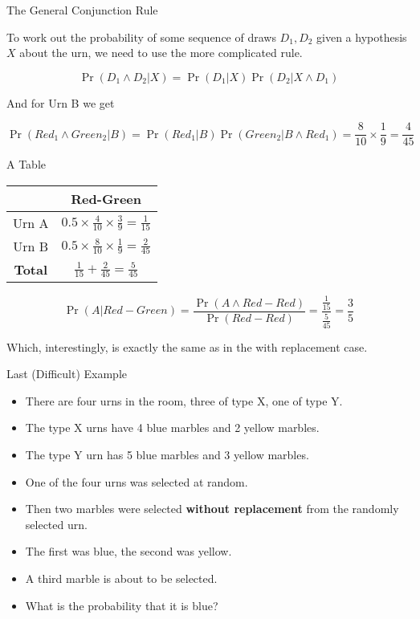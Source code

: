 \documentclass[
  ignorenonframetext,
]{beamer}
\providecommand{\tightlist}{%
  \setlength{\itemsep}{0pt}\setlength{\parskip}{0pt}}
\renewcommand{\,}{\text{, }}
\begin{document}
\begin{frame}{The General Conjunction Rule}
\protect\hypertarget{the-general-conjunction-rule-1}{}

To work out the probability of some sequence of draws \(D_1, D_2\) given
a hypothesis \(X\) about the urn, we need to use the more complicated
rule.

\[
\Pr(D_1 \wedge D_2 | X) = \Pr(D_1 | X) \Pr(D_2 | X \wedge D_1)
\]

And for Urn B we get

\[
\Pr(Red_1 \wedge Green_2 | B) = \Pr(Red_1 | B)\Pr(Green_2 | B \wedge Red_1) = \frac{8}{10} \times \frac{1}{9} = \frac{4}{45}
\]

\end{frame}

\begin{frame}{A Table}
\protect\hypertarget{a-table-4}{}

\begin{longtable}[]{@{}cc@{}}
\toprule
& Red-Green\tabularnewline
\midrule
\endhead
Urn A &
\(0.5 \times \frac{4}{10} \times \frac{3}{9} = \frac{1}{15}\)\tabularnewline
Urn B &
\(0.5 \times \frac{8}{10} \times \frac{1}{9} = \frac{2}{45}\)\tabularnewline
\textbf{Total} &
\(\frac{1}{15} + \frac{2}{45} = \frac{5}{45}\)\tabularnewline
\bottomrule
\end{longtable}

\pause

\[
\Pr(A | Red-Green) = \frac{\Pr(A \wedge Red-Red)}{\Pr(Red-Red)} = \frac{\frac{1}{15}}{\frac{5}{45}} = \frac{3}{5}
\]

Which, interestingly, is exactly the same as in the with replacement
case.

\end{frame}

\begin{frame}{Last (Difficult) Example}
\protect\hypertarget{last-difficult-example}{}

\begin{itemize}
\tightlist
\item
  There are four urns in the room, three of type X, one of type Y.
\item
  The type X urns have 4 blue marbles and 2 yellow marbles.
\item
  The type Y urn has 5 blue marbles and 3 yellow marbles.
\item
  One of the four urns was selected at random.
\item
  Then two marbles were selected \textbf{without replacement} from the
  randomly selected urn.
\item
  The first was blue, the second was yellow.
\item
  A third marble is about to be selected.
\item
  What is the probability that it is blue?
\end{itemize}

\end{frame}
\end{document}
